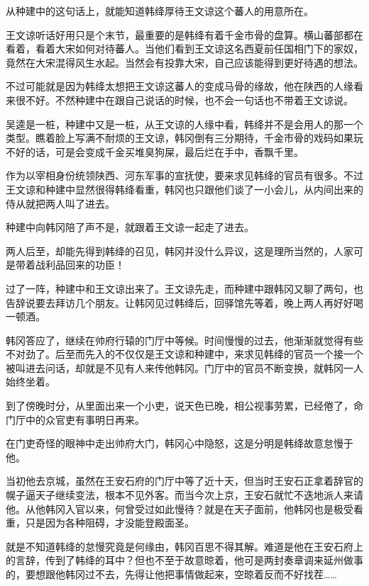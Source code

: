 从种建中的这句话上，就能知道韩绛厚待王文谅这个蕃人的用意所在。

王文谅听话好用只是个末节，最重要的是韩绛有着千金市骨的盘算。横山蕃部都在看着，看着大宋如何对待蕃人。当他们看到王文谅这名西夏前任国相门下的家奴，竟然在大宋混得风生水起。当然会有投靠大宋，自己应该能得到更好待遇的想法。

不过可能就是因为韩绛太想把王文谅这蕃人的变成马骨的缘故，他在陕西的人缘看来很不好。不然种建中在跟自己说话的时候，也不会一句话也不带着王文谅说。

吴逵是一桩，种建中又是一桩，从王文谅的人缘中看，韩绛并不是会用人的那一个类型。瞧着脸上写满不耐烦的王文谅，韩冈倒有三分期待，千金市骨的戏码如果玩不好的话，可是会变成千金买堆臭狗屎，最后烂在手中，香飘千里。

作为以宰相身份统领陕西、河东军事的宣抚使，要来求见韩绛的官员有很多。不过王文谅和种建中显然很得韩绛看重，韩冈也只跟他们谈了一小会儿，从内间出来的侍从就把两人叫了进去。

种建中向韩冈陪了声不是，就跟着王文谅一起走了进去。

两人后至，却能先得到韩绛的召见，韩冈并没什么异议，这是理所当然的，人家可是带着战利品回来的功臣！

过了一阵，种建中和王文谅出来了。王文谅先走，而种建中跟韩冈又聊了两句，也告辞说要去拜访几个朋友。让韩冈见过韩绛后，回驿馆先等着，晚上两人再好好喝一顿酒。

韩冈答应了，继续在帅府行辕的门厅中等候。时间慢慢的过去，他渐渐就觉得有些不对劲了。后至而先入的不仅仅是王文谅和种建中，来求见韩绛的官员一个接一个被叫进去问话，却就是不见有人来传他韩冈。门厅中的官员不断变换，就韩冈一人始终坐着。

到了傍晚时分，从里面出来一个小吏，说天色已晚，相公视事劳累，已经倦了，命门厅中的众官吏有事明日再来。

在门吏奇怪的眼神中走出帅府大门，韩冈心中隐怒，这是分明是韩绛故意怠慢于他。

当初他去京城，虽然在王安石府的门厅中等了近十天，但当时王安石正拿着辞官的幌子逼天子继续变法，根本不见外客。而当今次上京，王安石就忙不迭地派人来请他。从他韩冈入官以来，何曾受过如此慢待？就是在天子面前，他韩冈也是极受看重，只是因为各种阻碍，才没能登殿面圣。

就是不知道韩绛的怠慢究竟是何缘由，韩冈百思不得其解。难道是他在王安石府上的言辞，传到了韩绛的耳中？但也不至于故意晾着，他可是两封奏章调来延州做事的，要想跟他韩冈过不去，先得让他把事情做起来，空晾着反而不好找茬……

